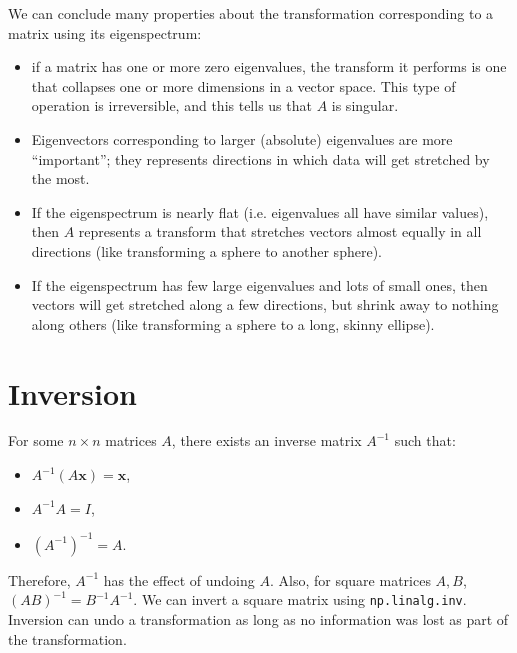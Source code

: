 \documentclass[a4paper, openany]{memoir}
\begin{document}
    We can conclude many properties about the transformation corresponding to a matrix using its eigenspectrum:
    \begin{itemize}
        \item if a matrix has one or more zero eigenvalues, the transform it performs is one that collapses one or more dimensions in a vector space. This type of operation is irreversible, and this tells us that $A$ is singular.
        
        \item Eigenvectors corresponding to larger (absolute) eigenvalues are more ``important''; they represents directions in which data will get stretched by the most.
        
        \item If the eigenspectrum is nearly flat (i.e. eigenvalues all have similar values), then $A$ represents a transform that stretches vectors almost equally in all directions (like transforming a sphere to another sphere).
        
        \item If the eigenspectrum has few large eigenvalues and lots of small ones, then vectors will get stretched along a few directions, but shrink away to nothing along others (like transforming a sphere to a long, skinny ellipse).
    \end{itemize}
    \newpage

    \section{Inversion}
    For some $n \times n$ matrices $A$, there exists an inverse matrix $A^{-1}$ such that:
    \begin{itemize}
        \item $A^{-1}(A \mathbf{x}) = \mathbf{x}$,
        \item $A^{-1}A = I$,
        \item $(A^{-1})^{-1} = A$.
    \end{itemize}
    Therefore, $A^{-1}$ has the effect of undoing $A$. 
    Also, for square matrices $A, B$, $(AB)^{-1} = B^{-1} A^{-1}$. We can invert a square matrix using \texttt{np.linalg.inv}. Inversion can undo a transformation as long as no information was lost as part of the transformation.
\end{document}

